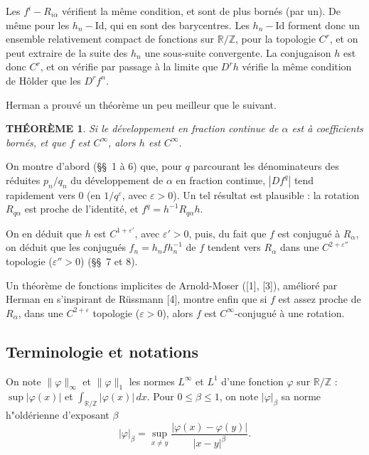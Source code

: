\documentclass[12pt]{amsart}
\theoremstyle{plain}
\newtheorem{theoreme}{TH\'{E}OR\`{E}ME}[section]
\theoremstyle{remark}
\begin{document}
Les $f^{i} - R_{i\alpha}$ v\'{e}rifient la m\^{e}me condition, et sont de plus born\'{e}s (par un). De m\^{e}me pour les $h_{n} - \mathrm{Id}$, qui en sont des barycentres. Les $h_{n} - \mathrm{Id}$ forment donc un ensemble relativement compact de fonctions sur $\mathbb{R}/\mathbb{Z}$, pour la topologie $C^{r}$, et on peut extraire de la suite des $h_{n}$ une sous-suite convergente. La conjugaison $h$ est donc $C^{r}$, et on v\'{e}rifie par passage \`{a} la limite que $D^{r}h$ v\'{e}rifie la m\^{e}me condition de H\^{o}lder que les $D^{r}f^{n}$.

Herman a prouv\'{e} un th\'{e}or\`{e}me un peu meilleur que le suivant.

\begin{theoreme}
Si le d\'{e}veloppement en fraction continue de $\alpha$ est \`{a} coefficients born\'{e}s, et que $f$ est $C^{\infty}$, alors $h$ est $C^{\infty}$.
\end{theoreme}

On montre d'abord (\S\S\ 1 \`{a} 6) que, pour $q$ parcourant les d\'{e}nominateurs des r\'{e}duites $p_{n}/q_{n}$ du d\'{e}veloppement de $\alpha$ en fraction continue, $|Df^{q}|$ tend rapidement vers $0$ (en $1/q^{\varepsilon}$, avec $\varepsilon > 0$). Un tel r\'{e}sultat est plausible : la rotation $R_{q\alpha}$ est proche de l'identit\'{e}, et $f^{q} = h^{-1}R_{q\alpha}h$.

On en d\'{e}duit que $h$ est $C^{1+\varepsilon'}$, avec $\varepsilon' > 0$, puis, du fait que $f$ est conjugu\'{e} \`{a} $R_{\alpha}$, on d\'{e}duit que les conjugu\'{e}s $f_{n} = h_{n}fh_{n}^{-1}$ de $f$ tendent vers $R_{\alpha}$ dans une $C^{2+\varepsilon''}$ topologie ($\varepsilon'' > 0$) (\S\S\ 7 et 8).

Un th\'{e}or\`{e}me de fonctions implicites de Arnold-Moser ([1], [3]), am\'{e}lior\'{e} par Herman en s'inspirant de R\"{u}ssmann [4], montre enfin que si $f$ est assez proche de $R_{\alpha}$, dans une $C^{2+\varepsilon}$ topologie ($\varepsilon > 0$), alors $f$ est $C^{\infty}$-conjugu\'{e} \`{a} une rotation.

\subsection*{Terminologie et notations}

On note $\|\varphi\|_{\infty}$ et $\|\varphi\|_{1}$ les normes $L^{\infty}$ et $L^{1}$ d'une fonction $\varphi$ sur $\mathbb{R}/\mathbb{Z}$ : $\sup|\varphi(x)|$ et $\int_{\mathbb{R}/\mathbb{Z}} |\varphi(x)|\,dx$. Pour $0 \leq \beta \leq 1$, on note $|\varphi|_{\beta}$ sa norme h"{o}ld\'{e}rienne d'exposant $\beta$
\[
|\varphi|_{\beta} = \sup_{x \neq y} \frac{|\varphi(x) - \varphi(y)|}{|x-y|^{\beta}} .
\]
\end{document}
